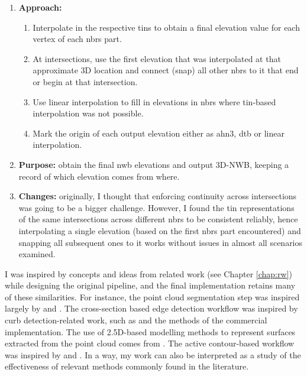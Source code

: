 \begin{enumerate}
\begin{enumerate}
        \item \textbf{Approach:}
        \begin{enumerate}
            \item Interpolate in the respective \ac{tin}s to obtain a final elevation value for each vertex of each \ac{nbrs} part.
            \item At intersections, use the first elevation that was interpolated at that approximate 3D location and connect (snap) all other \ac{nbrs} to it that end or begin at that intersection.
            \item Use linear interpolation to fill in elevations in \ac{nbrs} where \ac{tin}-based interpolation was not possible.
            \item Mark the origin of each output elevation either as \ac{ahn3}, \ac{dtb} or linear interpolation.
        \end{enumerate}
        \item \textbf{Purpose:} obtain the final \ac{nwb} elevations and output 3D-NWB, keeping a record of which elevation comes from where.
        \item \textbf{Changes:} originally, I thought that enforcing continuity across intersections was going to be a bigger challenge. However, I found the \ac{tin} representations of the same intersections across different \ac{nbrs} to be consistent reliably, hence interpolating a single elevation (based on the first \ac{nbrs} part encountered) and snapping all subsequent ones to it works without issues in almost all scenarios examined.
    \end{enumerate}
\end{enumerate}

I was inspired by concepts and ideas from related work (see Chapter \ref{chap:rw}) while designing the original pipeline, and the final implementation retains many of these similarities. For instance, the point cloud segmentation step was inspired largely by \cite{oudeElberink_vosselman_2009} and \cite{boyko_funkhauser_2011}. The cross-section based edge detection workflow was inspired by curb detection-related work, such as \cite{yang_etal_2013} and the methods of the commercial implementation. The use of 2.5D-based modelling methods to represent surfaces extracted from the point cloud comes from \cite{oudeElberink_vosselman_2006}. The active contour-based workflow was inspired by \cite{boyko_funkhauser_2011} and \cite{gopfert_etal_2011}. In a way, my work can also be interpreted as a study of the effectiveness of relevant methods commonly found in the literature.

